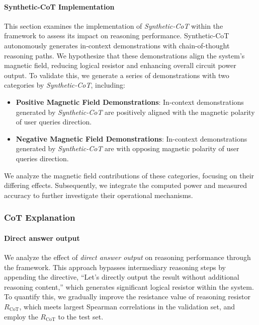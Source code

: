 \paragraph{Synthetic-CoT Implementation} 
This section examines the implementation of \textit{Synthetic-CoT} within the \modelname{} framework to assess its impact on reasoning performance. Synthetic-CoT autonomously generates in-context demonstrations with chain-of-thought reasoning paths. We hypothesize that these demonstrations align the system’s magnetic field, reducing logical resistor and enhancing overall circuit power output.
To validate this, we generate a series of demonstrations with two categories by \textit{Synthetic-CoT}, including:
\begin{itemize}[leftmargin=4ex]
    \item \textbf{Positive Magnetic Field Demonstrations}: In-context demonstrations generated by \textit{Synthetic-CoT} are positively aligned with the magnetic polarity of user queries direction.
    \item \textbf{Negative Magnetic Field Demonstrations}: In-context demonstrations generated by \textit{Synthetic-CoT} are with opposing magnetic polarity of user queries direction.
\end{itemize}
We analyze the magnetic field contributions of these categories, focusing on their differing effects. Subsequently, we integrate the computed power and measured accuracy to further investigate their operational mechanisms.

\subsubsection{CoT Explanation}
\paragraph{Direct answer output}  
We analyze the effect of \textit{direct answer output} on reasoning performance through the \modelname{} framework. This approach bypasses intermediary reasoning steps by appending the directive, ``Let’s directly output the result without additional reasoning content,'' which generates significant logical resistor within the system. To quantify this, we gradually improve the resistance value of reasoning resistor $R_{\text{CoT}}$, which meets largest Spearman correlations in the validation set, and employ the $R_{\text{CoT}}$ to the test set.

